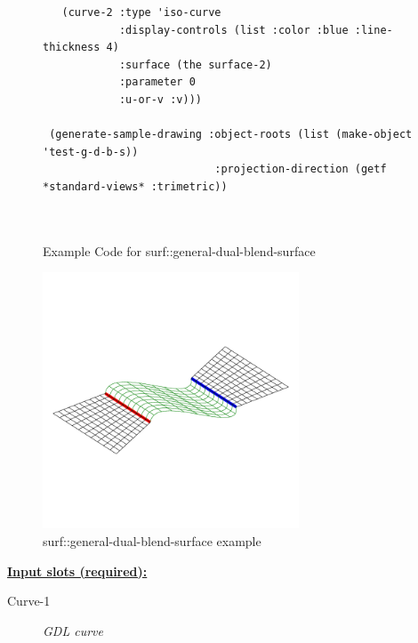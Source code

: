 \documentclass [11pt]{book}
\begin{document}
\begin{itemize}
\begin{figure}
\begin{lrbox}{\boxedverb}
\begin{minipage}{\linewidth}
{\begin{verbatim}
   (curve-2 :type 'iso-curve
            :display-controls (list :color :blue :line-thickness 4)
            :surface (the surface-2)
            :parameter 0
            :u-or-v :v)))

 (generate-sample-drawing :object-roots (list (make-object 'test-g-d-b-s))
                           :projection-direction (getf *standard-views* :trimetric))

 
\end{verbatim}}
\end{minipage}
\end{lrbox}
\fbox{\usebox{\boxedverb}}

\caption{Example Code for surf::general-dual-blend-surface}

\label{fig:example-code-surf::general-dual-blend-surface}

\end{figure}

\begin{figure}
\begin{center}
\includegraphics[width=3in,height=3in]{../images/example-surf::general-dual-blend-surface.pdf}
\end{center}

\caption{surf::general-dual-blend-surface example}

\label{fig:surf::general-dual-blend-surface}

\end{figure}





\textbf{
\underline{Input slots (required):}}

\begin{description}

\item [Curve-1]
\emph{GDL curve}


\end{description}
\end{itemize}
\end{document}
